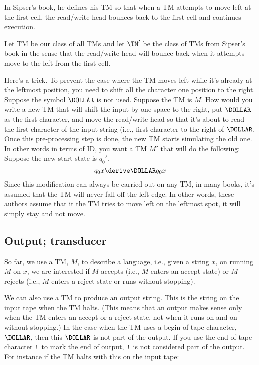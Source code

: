 In Sipser's book, he defines his TM so that
when a TM attempts to move left at the first cell, the read/write head
bounces back to the first cell and continues execution.

Let TM be our class of all TMs
and let $\TM'$ be the class of TMs from Sipser's book
in the sense that the read/write head will bounce back when it attempts
move to the left from the first cell.



\begin{eg} Here's a trick. To prevent the case where the TM moves
left while it's already at the leftmost position, you need to
shift all the character one position to the right.
Suppose the
symbol $\DOLLAR$ is not used. Suppose the TM is $M$. How would you
write a new TM that will shift the input by one space to the
right, put $\DOLLAR$ as the first character, and move the read/write
head so that it's about to read the first character of the input
string (i.e., first character to the right of $\DOLLAR$. Once this
pre-processing step is done, the new TM starts simulating the old
one. In other words in terms of ID, you want a TM $M'$ that will
do the following: Suppose the new start state is $q_0'$.
\[
 q_0x \derive \DOLLAR q_0x
\]
Since this modification can always be carried out on any TM, in
many books, it's assumed that the TM will never fall off the left
edge. In other words, these authors assume that it the TM tries to
move left on the leftmost spot, it will simply stay and not move.
\end{eg}


\newpage
\subsection{Output; transducer}

So far, we use a TM, $M$, to describe a language, i.e.,
given a string $x$, on running $M$ on $x$, we are interested if
$M$ accepts (i.e., $M$ enters an accept state)
or $M$ rejects (i.e., $M$ enters a reject state or runs without stopping).

We can also use a TM to produce an output string.
This is the string on the input tape when the TM halts.
(This means that an output makes sense only when the TM enters an accept
or a reject state, not when it runs on and on without stopping.)
In the case when the TM uses a begin-of-tape character, $\DOLLAR$,
then this $\DOLLAR$ is not part of the output.
If you use the end-of-tape character $\operatorname{\text{\texttt{!}}}$
to mark the end of output, $\operatorname{\text{\texttt{!}}}$ is not considered part of the output.
For instance if the TM halts with this on the input tape:

